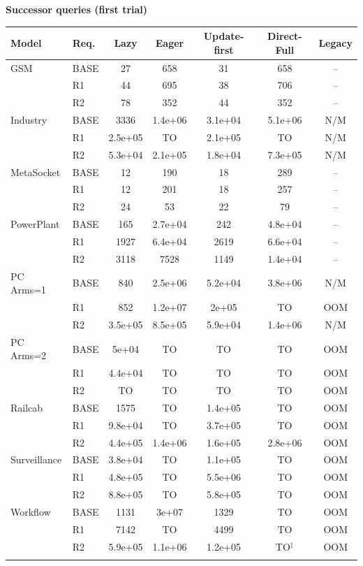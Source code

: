 \clearpage\noindent\textbf{Successor queries (first trial)}\par\smallskip
\begingroup\scriptsize\setlength{\tabcolsep}{3pt}
\begin{tabular}{@{}llccccc@{}}
\toprule
Model & Req. & Lazy & Eager & Update-first & Direct-Full & Legacy\\
\midrule
GSM & BASE & 27 & 658 & 31 & 658 & --\\
 & R1 & 44 & 695 & 38 & 706 & --\\
 & R2 & 78 & 352 & 44 & 352 & --\\
\addlinespace[2pt]
Industry & BASE & 3336 & 1.4e+06 & 3.1e+04 & 5.1e+06 & N/M\\
 & R1 & 2.5e+05 & TO & 2.1e+05 & TO & N/M\\
 & R2 & 5.3e+04 & 2.1e+05 & 1.8e+04 & 7.3e+05 & N/M\\
\addlinespace[2pt]
MetaSocket & BASE & 12 & 190 & 18 & 289 & --\\
 & R1 & 12 & 201 & 18 & 257 & --\\
 & R2 & 24 & 53 & 22 & 79 & --\\
\addlinespace[2pt]
PowerPlant & BASE & 165 & 2.7e+04 & 242 & 4.8e+04 & --\\
 & R1 & 1927 & 6.4e+04 & 2619 & 6.6e+04 & --\\
 & R2 & 3118 & 7528 & 1149 & 1.4e+04 & --\\
\addlinespace[2pt]
PC Arms=1 & BASE & 840 & 2.5e+06 & 5.2e+04 & 3.8e+06 & N/M\\
 & R1 & 852 & 1.2e+07 & 2e+05 & TO & OOM\\
 & R2 & 3.5e+05 & 8.5e+05 & 5.9e+04 & 1.4e+06 & N/M\\
\addlinespace[2pt]
PC Arms=2 & BASE & 5e+04 & TO & TO & TO & OOM\\
 & R1 & 4.4e+04 & TO & TO & TO & OOM\\
 & R2 & TO & TO & TO & TO & OOM\\
\addlinespace[2pt]
Railcab & BASE & 1575 & TO & 1.4e+05 & TO & OOM\\
 & R1 & 9.8e+04 & TO & 3.7e+05 & TO & OOM\\
 & R2 & 4.4e+05 & 1.4e+06 & 1.6e+05 & 2.8e+06 & OOM\\
\addlinespace[2pt]
Surveillance & BASE & 3.8e+04 & TO & 1.1e+05 & TO & OOM\\
 & R1 & 4.8e+05 & TO & 5.5e+06 & TO & OOM\\
 & R2 & 8.8e+05 & TO & 5.8e+05 & TO & OOM\\
\addlinespace[2pt]
Workflow & BASE & 1131 & 3e+07 & 1329 & TO & OOM\\
 & R1 & 7142 & TO & 4499 & TO & OOM\\
 & R2 & 5.9e+05 & 1.1e+06 & 1.2e+05 & TO$^{\ddagger}$ & OOM\\
\addlinespace[2pt]
\bottomrule
\end{tabular}\endgroup

